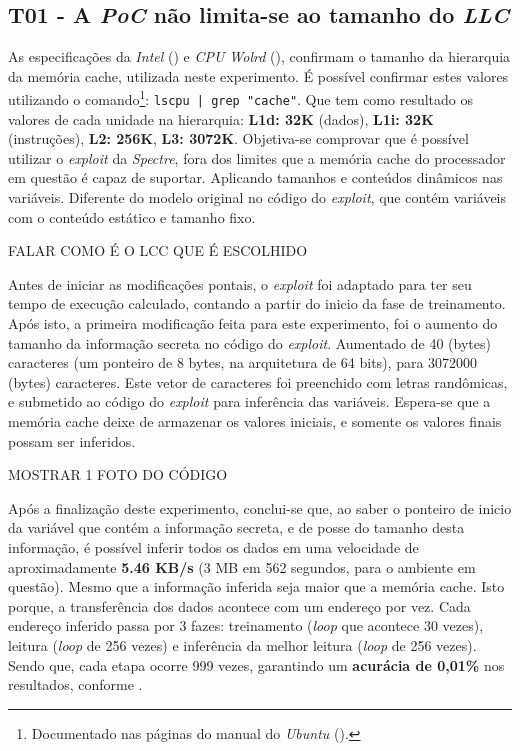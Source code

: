 \documentclass[
	article,			    %
	12pt,				    %
	oneside,			    %
	a4paper,			    %
	chapter=TITLE,		    %
	section=TITLE,		    %
	subsection=TITLE,	    %
	english,			    %
	brazil,				    %
	sumario=tradicional
]{abntex2}
\begin{document}
\subsection{T01 - A \emph{PoC} não limita-se ao tamanho do \emph{LLC}}
As especificações da \emph{Intel} (\citeyear{Intel2019Corei3}) e \emph{CPU Wolrd} (\citeyear{CpuWolrd2016Corei3}), confirmam o tamanho da hierarquia da memória cache, utilizada neste experimento. É possível confirmar estes valores utilizando o comando\footnote{Documentado nas páginas do manual do \emph{Ubuntu} (\citeyear{Ubuntu2019Lscpu}).}: \verb!lscpu | grep "cache"!. Que tem como resultado os valores de cada unidade na hierarquia: \textbf{L1d: 32K} (dados), \textbf{L1i: 32K} (instruções), \textbf{L2: 256K}, \textbf{L3: 3072K}. Objetiva-se comprovar que é possível utilizar o \emph{exploit} da \emph{Spectre}, fora dos limites que a memória cache do processador em questão é capaz de suportar. Aplicando tamanhos e conteúdos dinâmicos nas variáveis. Diferente do modelo original no código do \emph{exploit}, que contém variáveis com o conteúdo estático e tamanho fixo.

FALAR COMO É O LCC QUE É ESCOLHIDO

Antes de iniciar as modificações pontais, o \emph{exploit} foi adaptado para ter seu tempo de execução calculado, contando a partir do inicio da fase de treinamento. Após isto, a primeira modificação feita para este experimento, foi o aumento do tamanho da informação secreta no código do \emph{exploit}. Aumentado de 40 (bytes) caracteres (um ponteiro de 8 bytes, na arquitetura de 64 bits), para 3072000 (bytes) caracteres. Este vetor de caracteres foi preenchido com letras randômicas, e submetido ao código do \emph{exploit} para inferência das variáveis. Espera-se que a memória cache deixe de armazenar os valores iniciais, e somente os valores finais possam ser inferidos.

MOSTRAR 1 FOTO DO CÓDIGO

Após a finalização deste experimento, conclui-se que, ao saber o ponteiro de inicio da variável que contém a informação secreta, e de posse do tamanho desta informação, é possível inferir todos os dados em uma velocidade de aproximadamente \textbf{5.46 KB/s} (3 MB em 562 segundos, para o ambiente em questão). Mesmo que a informação inferida seja maior que a memória cache. Isto porque, a transferência dos dados acontece com um endereço por vez. Cada endereço inferido passa por 3 fazes: treinamento (\emph{loop} que acontece 30 vezes), leitura (\emph{loop} de 256 vezes) e inferência da melhor leitura (\emph{loop} de 256 vezes). Sendo que, cada etapa ocorre 999 vezes, garantindo um \textbf{acurácia de 0,01\%} nos resultados, conforme .
\end{document}
